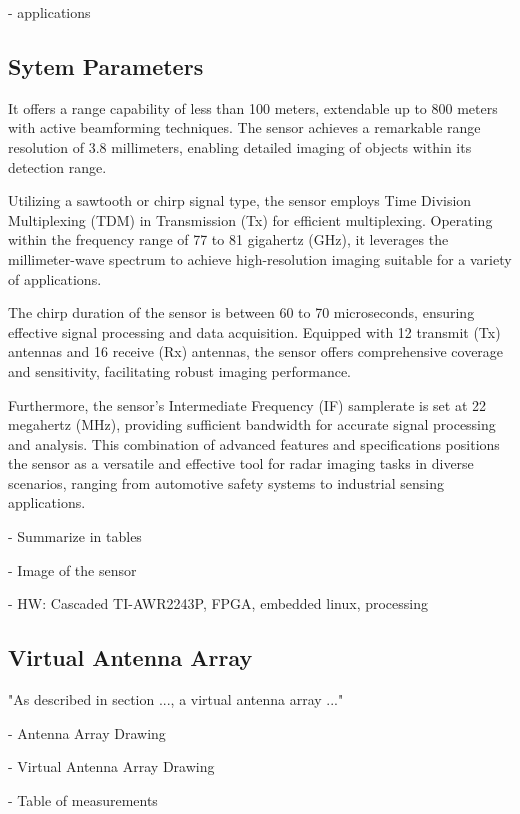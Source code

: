 - applications

\subsection{Sytem Parameters}
It offers a range capability of less than 100 meters, extendable up to 800 meters with active beamforming techniques.
The sensor achieves a remarkable range resolution of 3.8 millimeters, enabling detailed imaging of objects within its detection range.

Utilizing a sawtooth or chirp signal type, the sensor employs Time Division Multiplexing (TDM) in Transmission (Tx) for efficient multiplexing.
Operating within the frequency range of 77 to 81 gigahertz (GHz),
it leverages the millimeter-wave spectrum to achieve high-resolution imaging suitable for a variety of applications.

The chirp duration of the sensor is between 60 to 70 microseconds, ensuring effective signal processing and data acquisition.
Equipped with 12 transmit (Tx) antennas and 16 receive (Rx) antennas, the sensor offers comprehensive coverage and sensitivity,
facilitating robust imaging performance.

Furthermore, the sensor's Intermediate Frequency (IF) samplerate is set at 22 megahertz (MHz),
providing sufficient bandwidth for accurate signal processing and analysis.
This combination of advanced features and specifications positions the sensor as a versatile and effective tool for radar imaging tasks in diverse scenarios,
ranging from automotive safety systems to industrial sensing applications.

- Summarize in tables

- Image of the sensor

- HW: Cascaded TI-AWR2243P, FPGA, embedded linux, processing

\subsection{Virtual Antenna Array}

"As described in section ..., a virtual antenna array ..."

- Antenna Array Drawing

- Virtual Antenna Array Drawing

- Table of measurements



